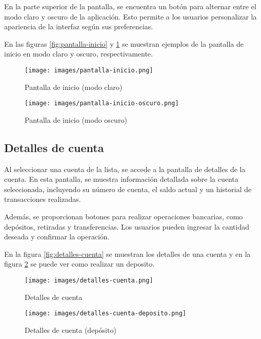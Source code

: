 \documentclass[12pt]{article}
\begin{document}
En la parte superior de la pantalla, se encuentra un botón para alternar entre el modo claro y oscuro de la aplicación. Esto permite a los usuarios personalizar la apariencia de la interfaz según sus preferencias.

En las figuras \ref{fig:pantalla-inicio} y \ref{fig:pantalla-inicio-oscuro} se muestran ejemplos de la pantalla de inicio en modo claro y oscuro, respectivamente.

\begin{figure}[H]
    \centering
    \begin{minipage}[b]{0.48\textwidth}
        \centering
        \texttt{[image: images/pantalla-inicio.png]}
        \caption{Pantalla de inicio (modo claro)}
        \label{fig:pantalla-inicio}
    \end{minipage}
    \hfill
    \begin{minipage}[b]{0.48\textwidth}
        \centering
        \texttt{[image: images/pantalla-inicio-oscuro.png]}
        \caption{Pantalla de inicio (modo oscuro)}
        \label{fig:pantalla-inicio-oscuro}
    \end{minipage}
\end{figure}

\subsection*{Detalles de cuenta}

Al seleccionar una cuenta de la lista, se accede a la pantalla de detalles de la cuenta. En esta pantalla, se muestra información detallada sobre la cuenta seleccionada, incluyendo su número de cuenta, el saldo actual y un historial de transacciones realizadas.

Además, se proporcionan botones para realizar operaciones bancarias, como depósitos, retiradas y transferencias. Los usuarios pueden ingresar la cantidad deseada y confirmar la operación.

En la figura \ref{fig:detalles-cuenta} se muestran los detalles de una cuenta y en la figura \ref{fig:detalles-cuenta-deposito} se puede ver como realizar un deposito.

\begin{figure}[H]
    \centering
    \begin{minipage}[b]{0.48\textwidth}
        \centering
        \texttt{[image: images/detalles-cuenta.png]}
        \caption{Detalles de cuenta}
        \label{fig:detalles-cuenta}
    \end{minipage}
    \hfill
    \begin{minipage}[b]{0.48\textwidth}
        \centering
        \texttt{[image: images/detalles-cuenta-deposito.png]}
        \caption{Detalles de cuenta (depósito)}
        \label{fig:detalles-cuenta-deposito}
    \end{minipage}
\end{figure}
\end{document}
